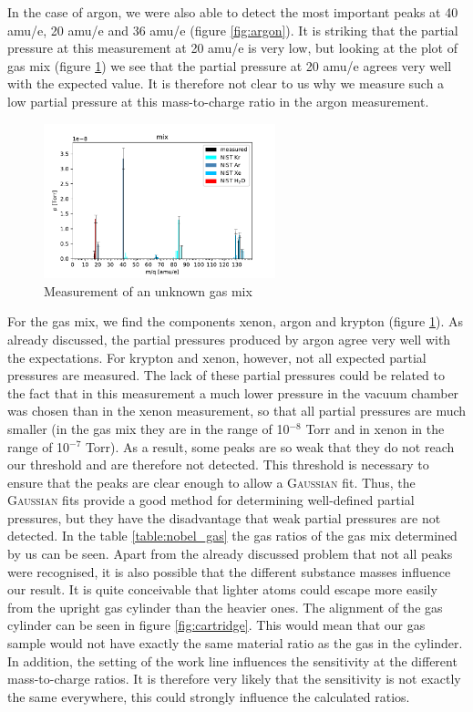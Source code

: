     In the case of argon, we were also able to detect the most important peaks at 40 amu/e, 20 amu/e and 36 amu/e (figure \ref{fig:argon}). It is striking that the partial pressure at this measurement at 20 amu/e is very low, but looking at the plot of gas mix (figure \ref{fig:mix})  we see that the partial pressure at 20 amu/e agrees very well with the expected value. It is therefore not clear to us why we measure such a low partial pressure at this mass-to-charge ratio in the argon measurement. 
    
     
    \begin{figure}[h!]
        \centering
        \includegraphics[width=0.6\textwidth]{Report/DataResultsPlots/mix.pdf}
        \caption{Measurement of an unknown gas mix}
        \label{fig:mix}
    \end{figure}
    
       For the gas mix, we find the components xenon, argon and krypton (figure \ref{fig:mix}). As already discussed, the partial pressures produced by argon agree very well with the expectations. For krypton and xenon, however, not all expected partial pressures are measured. The lack of these partial pressures could be related to the fact that in this measurement a much lower pressure in the vacuum chamber was chosen than in the xenon measurement, so that all partial pressures are much smaller (in the gas mix they are in the range of 10$^{-8}$ Torr and in xenon in the range of 10$^{-7}$ Torr). As a result, some peaks are so weak that they do not reach our threshold and are therefore not detected. This threshold is necessary to ensure that the peaks are clear enough to allow a {\scshape Gaussian} fit. Thus, the {\scshape Gaussian} fits provide a good method for determining well-defined partial pressures, but they have the disadvantage that weak partial pressures are not detected. In the table \ref{table:nobel_gas} the gas ratios of the gas mix determined by us can be seen. Apart from the already discussed problem that not all peaks were recognised, it is also possible that the different substance masses influence our result. It is quite conceivable that lighter atoms could escape more easily from the upright gas cylinder than the heavier ones. The alignment of the gas cylinder can be seen in figure \ref{fig:cartridge}. This would mean that our gas sample would not have exactly the same material ratio as the gas in the cylinder. In addition, the setting of the work line influences the sensitivity at the different mass-to-charge ratios. It is therefore very likely that the sensitivity is not exactly the same everywhere, this could strongly influence the calculated ratios. 
    
